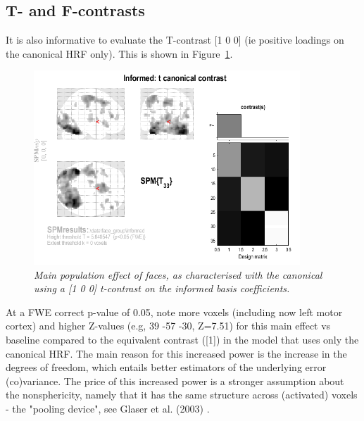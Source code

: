 \subsection{T- and F-contrasts}

	It is also informative to evaluate the T-contrast [1 0 0] (ie positive loadings on the canonical HRF only). This is 
	shown in Figure~\ref{informed_t}.
	\begin{figure}
\begin{center}
\includegraphics[width=100mm]{informed_t}
\caption{\em Main population effect of faces, as characterised with the canonical using a [1 0 0] t-contrast on the informed basis coefficients. \label{informed_t}}
\end{center}
\end{figure}
At a FWE correct p-value of 0.05, note more voxels (including now left motor cortex) and higher Z-values (e.g, 39 -57 -30, Z=7.51) for this main effect vs baseline compared to the equivalent contrast ([1]) in the model that uses only the canonical HRF. 
The main reason for this increased power is the increase in the degrees of freedom, which entails better estimators of the underlying error (co)variance. The price of this increased power is a stronger assumption about the nonsphericity, namely that it has the same structure across (activated) voxels - the "pooling device", see Glaser et al. (2003) \cite{daniel_hbf2}.

